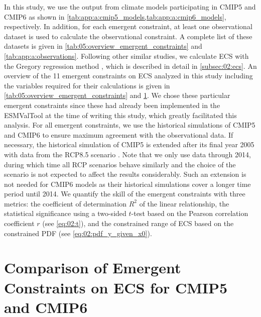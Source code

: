 In this study, we use the output from climate models participating in
\acs{CMIP}5 and \acs{CMIP}6 as shown in
\cref{tab:app:a:cmip5_models,tab:app:a:cmip6_models}, respectively. In
addition, for each emergent constraint, at least one observational dataset is
used to calculate the observational constraint. A complete list of these
datasets is given in \cref{tab:05:overview_emergent_constraints} and
\cref{tab:app:a:observations}. Following other similar studies, we calculate
\ac{ECS} with the Gregory regression method \autocite{Gregory2004}, which is
described in detail in \cref{subsec:02:ecs}. An overview of the 11 emergent
constraints on \ac{ECS} analyzed in this study including the variables required
for their calculations is given in \cref{tab:05:overview_emergent_constraints}
and \cref{sec:05:comparison_of_emergent_constraints}. We chose these particular
emergent constraints since these had already been implemented in the
\ac{ESMValTool} at the time of writing this study, which greatly facilitated
this analysis. For all emergent constraints, we use the historical simulations
of \acs{CMIP}5 and \acs{CMIP}6 to ensure maximum agreement with the
observational data. If necessary, the historical simulation of \acs{CMIP}5 is
extended after its final year 2005 with data from the \acs{RCP}8.5 scenario
\autocite{Riahi2011}. Note that we only use data through 2014, during which
time all \ac{RCP} scenarios behave similarly and the choice of the scenario is
not expected to affect the results considerably. Such an extension is not
needed for \acs{CMIP}6 models as their historical simulations cover a longer
time period until 2014. We quantify the skill of the emergent constraints with
three metrics: the coefficient of determination $R^2$ of the linear
relationship, the statistical significance using a two-sided $t$-test based on
the Pearson correlation coefficient $r$ (see \cref{eq:02:t}), and the
constrained range of \ac{ECS} based on the constrained \ac{PDF} (see
\cref{eq:02:pdf_y_given_x0}).


\section{Comparison of Emergent Constraints on \acs{ECS} for \acs{CMIP}5 and
  \acs{CMIP}6}
\label{sec:05:comparison_of_emergent_constraints}

